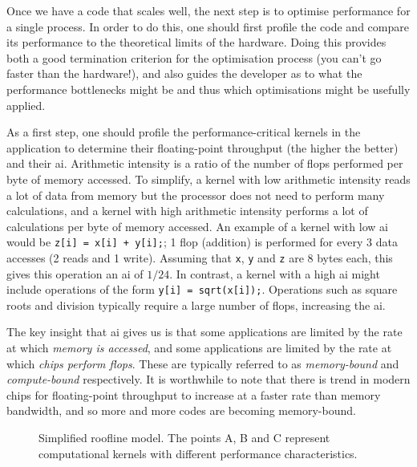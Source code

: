 Once we have a code that scales well, the next step is to optimise performance for a single process.
In order to do this, one should first profile the code and compare its performance to the theoretical limits of the hardware.
Doing this provides both a good termination criterion for the optimisation process (you can't go faster than the hardware!), and also guides the developer as to what the performance bottlenecks might be and thus which optimisations might be usefully applied.

As a first step, one should profile the performance-critical kernels in the application to determine their floating-point throughput (the higher the better) and their \gls{ai}.
Arithmetic intensity is a ratio of the number of \glspl{flop} performed per byte of memory accessed.
To simplify, a kernel with low arithmetic intensity reads a lot of data from memory but the processor does not need to perform many calculations, and a kernel with high arithmetic intensity performs a lot of calculations per byte of memory accessed.
An example of a kernel with low \gls{ai} would be \texttt{z[i] = x[i] + y[i];}; 1 \gls{flop} (addition) is performed for every 3 data accesses (2 reads and 1 write).
Assuming that \texttt{x}, \texttt{y} and \texttt{z} are 8 bytes each, this gives this operation an \gls{ai} of $1/24$.
In contrast, a kernel with a high \gls{ai} might include operations of the form \texttt{y[i] = sqrt(x[i]);}.
Operations such as square roots and division typically require a large number of \glspl{flop}, increasing the \gls{ai}.

The key insight that \gls{ai} gives us is that some applications are limited by the rate at which \textit{memory is accessed}, and some applications are limited by the rate at which \textit{chips perform \glspl{flop}}.
These are typically referred to as \textit{memory-bound} and \textit{compute-bound} respectively.
It is worthwhile to note that there is trend in modern chips for floating-point throughput to increase at a faster rate than memory bandwidth, and so more and more codes are becoming memory-bound.

\begin{figure}
  
  \caption{
    Simplified roofline model.
    The points A, B and C represent computational kernels with different performance characteristics.
  }
  \label{fig:roofline}
\end{figure}

